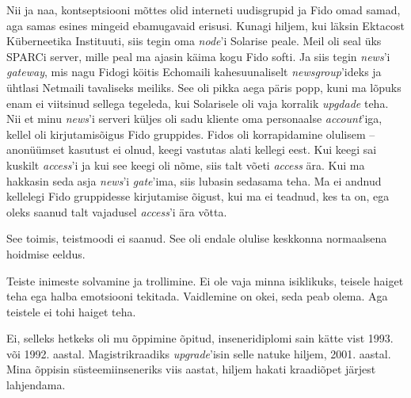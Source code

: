Nii ja naa, kontseptsiooni mõttes olid interneti uudisgrupid ja Fido omad 
samad, aga samas esines mingeid ebamugavaid erisusi. Kunagi hiljem, kui läksin
Ektacost Küberneetika Instituuti, siis tegin oma 
\emph{node}'i Solarise peale. Meil oli seal üks 
SPARCi server, mille peal ma ajasin käima kogu Fido softi. 
Ja siis tegin \emph{news}'i \emph{gateway}, 
mis nagu Fidogi köitis Echomaili kahesuunaliselt \emph{newsgroup}'ideks ja 
ühtlasi Netmaili tavaliseks meiliks. See oli pikka aega päris popp, kuni ma lõpuks enam ei viitsinud sellega tegeleda, kui Solarisele oli vaja korralik \emph{upgdade} teha. Nii et minu \emph{news}'i 
serveri küljes oli sadu kliente oma personaalse \emph{account}'iga, kellel oli kirjutamisõigus Fido gruppides. 
Fidos oli korrapidamine olulisem -- anonüümset 
kasutust ei olnud, keegi vastutas alati kellegi eest. Kui keegi sai kuskilt
\emph{access}'i ja kui see keegi oli nõme, siis talt võeti \emph{access} 
ära. Kui ma hakkasin seda asja \emph{news}'i \emph{gate}'ima, siis lubasin sedasama 
teha. Ma ei andnud kellelegi Fido gruppidesse kirjutamise õigust, kui ma 
ei teadnud, kes ta on, ega oleks saanud talt vajadusel \emph{access}'i ära võtta. 


See toimis, teistmoodi ei saanud. See oli endale olulise keskkonna normaalsena hoidmise 
eeldus. 


Teiste inimeste solvamine ja trollimine. Ei ole vaja minna isiklikuks, teisele haiget teha ega halba emotsiooni tekitada. Vaidlemine on okei, seda peab olema. Aga teistele ei tohi haiget teha. 


Ei, selleks hetkeks oli mu õppimine õpitud, inseneridiplomi sain kätte vist 1993. või 1992. aastal. Magistrikraadiks \emph{upgrade}'isin selle natuke 
hiljem, 2001. aastal. Mina õppisin süsteemiinseneriks viis aastat, hiljem 
hakati kraadiõpet järjest lahjendama.  


